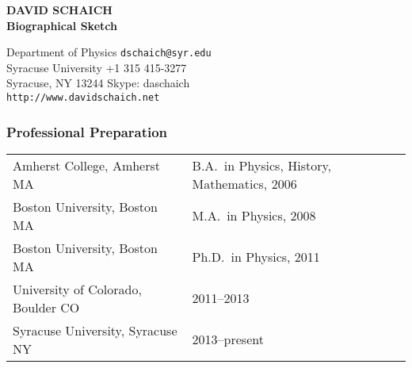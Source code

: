 \documentclass[12 pt]{article}
\begin{document}
\setlength{\abovedisplayskip}{6 pt}
\setlength{\belowdisplayskip}{6 pt}
\vspace{-24 pt}
\begin{center} {\large{\bf DAVID SCHAICH}} \\ {\bf Biographical Sketch}\end{center} %
\vspace{12 pt}



\noindent
Department of Physics \hfill \texttt{dschaich@syr.edu} \\
Syracuse University   \hfill +1 315 415-3277           \\
Syracuse, NY 13244    \hfill Skype: daschaich          \\
\texttt{http://www.davidschaich.net}

\subsubsection*{Professional Preparation} %
\begin{tabular}[t]{ll}
  Amherst College, Amherst MA               & B.A.~in Physics, History, Mathematics, 2006 \\
  Boston University, Boston MA              & M.A.~in Physics, 2008                       \\
  Boston University, Boston MA              & Ph.D.~in Physics, 2011                      \\
  University of Colorado, Boulder CO \qquad & 2011--2013                                  \\
  Syracuse University, Syracuse NY          & 2013--present                               \\
\end{tabular}
\end{document}
